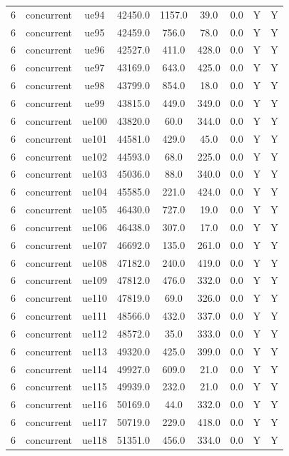 \begin{table}[ht]
\begin{tabular}{|c|c|c|c|c|c|c|c|c|}
6 & concurrent & ue94 & 42450.0 & 1157.0 & 39.0 & 0.0 & Y & Y \\
6 & concurrent & ue95 & 42459.0 & 756.0 & 78.0 & 0.0 & Y & Y \\
6 & concurrent & ue96 & 42527.0 & 411.0 & 428.0 & 0.0 & Y & Y \\
6 & concurrent & ue97 & 43169.0 & 643.0 & 425.0 & 0.0 & Y & Y \\
6 & concurrent & ue98 & 43799.0 & 854.0 & 18.0 & 0.0 & Y & Y \\
6 & concurrent & ue99 & 43815.0 & 449.0 & 349.0 & 0.0 & Y & Y \\
6 & concurrent & ue100 & 43820.0 & 60.0 & 344.0 & 0.0 & Y & Y \\
6 & concurrent & ue101 & 44581.0 & 429.0 & 45.0 & 0.0 & Y & Y \\
6 & concurrent & ue102 & 44593.0 & 68.0 & 225.0 & 0.0 & Y & Y \\
6 & concurrent & ue103 & 45036.0 & 88.0 & 340.0 & 0.0 & Y & Y \\
6 & concurrent & ue104 & 45585.0 & 221.0 & 424.0 & 0.0 & Y & Y \\
6 & concurrent & ue105 & 46430.0 & 727.0 & 19.0 & 0.0 & Y & Y \\
6 & concurrent & ue106 & 46438.0 & 307.0 & 17.0 & 0.0 & Y & Y \\
6 & concurrent & ue107 & 46692.0 & 135.0 & 261.0 & 0.0 & Y & Y \\
6 & concurrent & ue108 & 47182.0 & 240.0 & 419.0 & 0.0 & Y & Y \\
6 & concurrent & ue109 & 47812.0 & 476.0 & 332.0 & 0.0 & Y & Y \\
6 & concurrent & ue110 & 47819.0 & 69.0 & 326.0 & 0.0 & Y & Y \\
6 & concurrent & ue111 & 48566.0 & 432.0 & 337.0 & 0.0 & Y & Y \\
6 & concurrent & ue112 & 48572.0 & 35.0 & 333.0 & 0.0 & Y & Y \\
6 & concurrent & ue113 & 49320.0 & 425.0 & 399.0 & 0.0 & Y & Y \\
6 & concurrent & ue114 & 49927.0 & 609.0 & 21.0 & 0.0 & Y & Y \\
6 & concurrent & ue115 & 49939.0 & 232.0 & 21.0 & 0.0 & Y & Y \\
6 & concurrent & ue116 & 50169.0 & 44.0 & 332.0 & 0.0 & Y & Y \\
6 & concurrent & ue117 & 50719.0 & 229.0 & 418.0 & 0.0 & Y & Y \\
6 & concurrent & ue118 & 51351.0 & 456.0 & 334.0 & 0.0 & Y & Y \\

\end{tabular}
\end{table}
